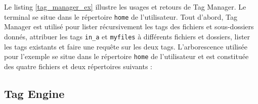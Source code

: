 Le listing \ref{tag_manager_ex} illustre les usages et retours de Tag Manager. Le terminal se situe 
dans le répertoire \texttt{home} de l'utilisateur. Tout d'abord, Tag Manager est utilisé pour 
lister récursivement les tags des fichiers et sous-dossiers donnés, attribuer les tags \texttt{in_a} 
et \texttt{myfiles} à différents fichiers et dossiers, lister les tags existants et faire 
une requête sur les deux tags. L'arborescence utilisée pour l'exemple se situe dans le répertoire 
\texttt{home} de l'utilisateur et est constituée des quatre fichiers et deux répertoires suivants :
\bigbreak
{}
\bigbreak


\subsection{Tag Engine}\label{tag_engine_realisation}
